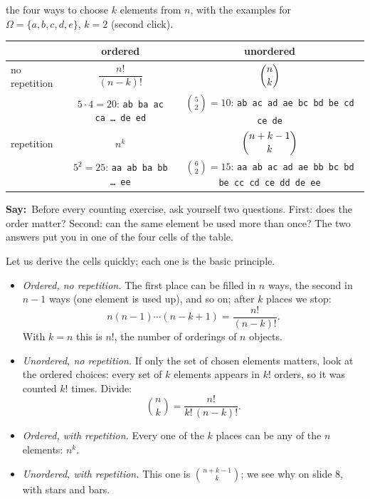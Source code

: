 \documentclass[11pt,a4paper,parskip=half]{scrartcl}
\newcommand{\Om}{\Omega}
\newcommand{\say}{\textbf{\color{teal}Say:}\ }
\begin{document}
\needspace{0.3\textheight}
\begin{slidefig}
	the four ways to choose $k$ elements from $n$, with the examples for
	$\Om=\{a,b,c,d,e\}$, $k=2$ (second click).
	\begin{center}
		\renewcommand{\arraystretch}{1.2}
		\begin{tabular}{@{}lcc@{}}
			\toprule
			              & ordered                                    & unordered                              \\
			\midrule
			no repetition & $\dfrac{n!}{(n-k)!}$                       & $\dbinom nk$                           \\
			              & \parbox[t]{5.2cm}{\centering\footnotesize
			$5\cdot4=20$: \texttt{ab ba ac ca \dots\ de ed}}
			              & \parbox[t]{5.2cm}{\centering\footnotesize
			$\binom52=10$: \texttt{ab ac ad ae bc bd be cd ce de}}                                                \\[3mm]
			\midrule
			repetition    & $n^k$                                      & $\dbinom{n+k-1}{k}$                    \\
			              & \parbox[t]{5.2cm}{\centering\footnotesize
			$5^2=25$: \texttt{aa ab ba bb \dots\ ee}}
			              & \parbox[t]{5.2cm}{\centering\footnotesize
			$\binom62=15$: \texttt{aa ab ac ad ae bb bc bd be cc cd ce dd de ee}}                                 \\[5mm]
			\bottomrule
		\end{tabular}
	\end{center}
\end{slidefig}

\say Before every counting exercise, ask yourself two questions. First:
does the order matter? Second: can the same element be used more than once?
The two answers put you in one of the four cells of the table.

Let us derive the cells quickly; each one is the basic principle.
\begin{itemize}
	\item \emph{Ordered, no repetition.} The first place can be filled in
	      $n$ ways, the second in $n-1$ ways (one element is used up), and
	      so on; after $k$ places we stop:
	      \[ n(n-1)\cdots(n-k+1)=\frac{n!}{(n-k)!}. \]
	      With $k=n$ this is $n!$, the number of orderings of $n$ objects.
	\item \emph{Unordered, no repetition.} If only the set of chosen
	      elements matters, look at the ordered choices: every set of $k$
	      elements appears in $k!$ orders, so it was counted $k!$ times.
	      Divide:
	      \[ \binom nk=\frac{n!}{k!\,(n-k)!}. \]
	\item \emph{Ordered, with repetition.} Every one of the $k$ places can
	      be any of the $n$ elements: $n^k$.
	\item \emph{Unordered, with repetition.} This one is $\binom{n+k-1}{k}$;
	      we see why on slide 8, with stars and bars.
\end{itemize}
\end{document}
